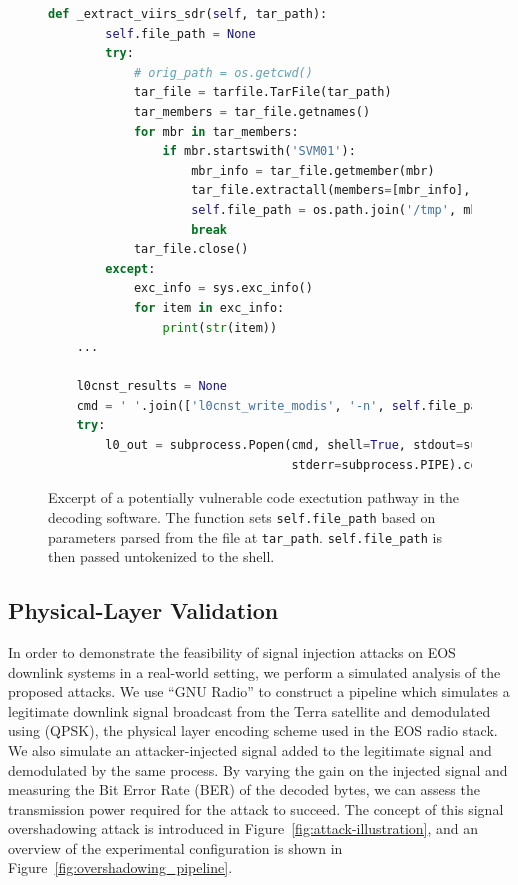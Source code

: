 \begin{figure}
    \centering
    \begin{lstlisting}[language=Python]
    def _extract_viirs_sdr(self, tar_path):
        self.file_path = None
        try:
            # orig_path = os.getcwd()
            tar_file = tarfile.TarFile(tar_path)
            tar_members = tar_file.getnames()
            for mbr in tar_members:
                if mbr.startswith('SVM01'):
                    mbr_info = tar_file.getmember(mbr)
                    tar_file.extractall(members=[mbr_info], path='/tmp')
                    self.file_path = os.path.join('/tmp', mbr)
                    break
            tar_file.close()
        except:
            exc_info = sys.exc_info()
            for item in exc_info:
                print(str(item))
    ...

    l0cnst_results = None
    cmd = ' '.join(['l0cnst_write_modis', '-n', self.file_path])
    try:
        l0_out = subprocess.Popen(cmd, shell=True, stdout=subprocess.PIPE,
                                  stderr=subprocess.PIPE).communicate()[0]
    \end{lstlisting}
    \caption{Excerpt of a potentially vulnerable code exectution pathway in the decoding software. The function sets \texttt{self.file\_path} based on parameters parsed from the file at \texttt{tar\_path}. \texttt{self.file\_path} is then passed untokenized to the shell.}
    \label{fig:code-execution}
\end{figure}

\subsection{Physical-Layer Validation}\label{sec:physical-layer-validation}

In order to demonstrate the feasibility of signal injection attacks on EOS downlink systems in a real-world setting, we perform a simulated analysis of the proposed attacks.
We use ``GNU Radio'' to construct a pipeline which simulates a legitimate downlink signal broadcast from the Terra satellite and demodulated using (QPSK), the physical layer encoding scheme used in the EOS radio stack.
We also simulate an attacker-injected signal added to the legitimate signal and demodulated by the same process.
By varying the gain on the injected signal and measuring the Bit Error Rate (BER) of the decoded bytes, we can assess the transmission power required for the attack to succeed.
The concept of this signal overshadowing attack is introduced in Figure~\ref{fig:attack-illustration}, and an overview of the experimental configuration is shown in Figure~\ref{fig:overshadowing_pipeline}.

